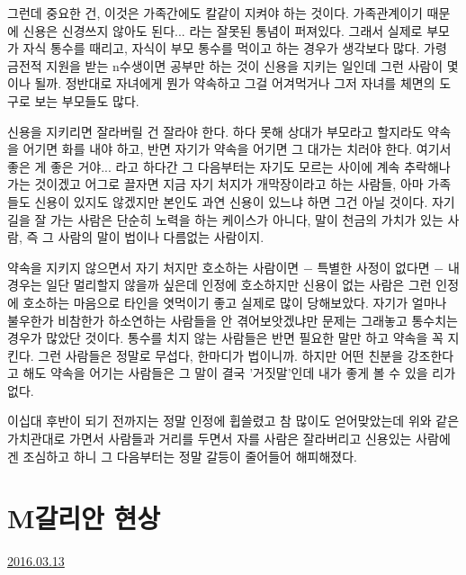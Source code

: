 그런데 중요한 건, 이것은 가족간에도 칼같이 지켜야 하는 것이다.
가족관계이기 때문에 신용은 신경쓰지 않아도 된다... 라는 잘못된 통념이 퍼져있다.
그래서 실제로 부모가 자식 통수를 때리고, 자식이 부모 통수를 먹이고 하는 경우가 생각보다 많다.
가령 금전적 지원을 받는 n수생이면 공부만 하는 것이 신용을 지키는 일인데 그런 사람이 몇이나 될까.
정반대로 자녀에게 뭔가 약속하고 그걸 어겨먹거나 그저 자녀를 체면의 도구로 보는 부모들도 많다.
\vspace{5mm}

신용을 지키리면 잘라버릴 건 잘라야 한다.
하다 못해 상대가 부모라고 할지라도 약속을 어기면 화를 내야 하고, 반면 자기가 약속을 어기면 그 대가는 치러야 한다.
여기서 좋은 게 좋은 거야... 라고 하다간 그 다음부터는 자기도 모르는 사이에 계속 추락해나가는 것이겠고
어그로 끌자면 지금 자기 처지가 개막장이라고 하는 사람들,
아마 가족들도 신용이 있지도 않겠지만 본인도 과연 신용이 있느냐 하면 그건 아닐 것이다.
자기 길을 잘 가는 사람은 단순히 노력을 하는 케이스가 아니다, 말이 천금의 가치가 있는 사람,
즉 그 사람의 말이 법이나 다름없는 사람이지.
\vspace{5mm}

약속을 지키지 않으면서 자기 처지만 호소하는 사람이면 $-$ 특별한 사정이 없다면 $-$ 내 경우는 일단 멀리할지 않을까 싶은데
인정에 호소하지만 신용이 없는 사람은 그런 인정에 호소하는 마음으로 타인을 엿먹이기 좋고 실제로 많이 당해보았다.
자기가 얼마나 불우한가 비참한가 하소연하는 사람들을 안 겪어보앗겠냐만 문제는 그래놓고 통수치는 경우가 많았단 것이다.
통수를 치지 않는 사람들은 반면 필요한 말만 하고 약속을 꼭 지킨다. 그런 사람들은 정말로 무섭다, 한마디가 법이니까.
하지만 어떤 친분을 강조한다고 해도 약속을 어기는 사람들은 그 말이 결국 '거짓말'인데 내가 좋게 볼 수 있을 리가 없다.
\vspace{5mm}

이십대 후반이 되기 전까지는 정말 인정에 휩쓸렸고 참 많이도 얻어맞았는데
위와 같은 가치관대로 가면서 사람들과 거리를 두면서 자를 사람은 잘라버리고 신용있는 사람에겐 조심하고 하니
그 다음부터는 정말 갈등이 줄어들어 해피해졌다.
\vspace{5mm}






\section{M갈리안 현상}
\href{https://www.kockoc.com/Apoc/675258}{2016.03.13}

\vspace{5mm}


